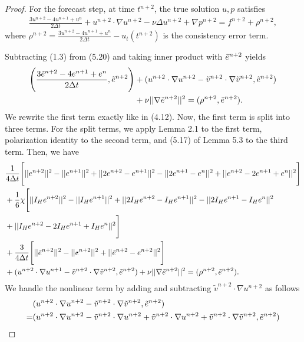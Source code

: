 \documentclass[10pt,a4paper]{amsart}
\begin{document}
\begin{proof}
    For the forecast step, at time $t^{n+2}$, the true solution $u,p$ satisfies
    \begin{align}
        \frac{3u^{n+2}-4u^{n+1}+u^n}{2\Delta t}+u^{n+2} \cdot \nabla u^{n+2} - \nu \Delta u^{n+2} + \nabla p^{n+2}=f^{n+2}+\rho^{n+2},
    \end{align}
    where $\rho^{n+2}=\frac{3u^{n+2}-4u^{n+1}+u^n}{2\Delta t}-u_t(t^{n+2})$ is the consistency error term.
    
    Subtracting (1.3) from (5.20) and taking inner product with $\Tilde{e}^{n+2}$ yields
    \begin{align}
        \Bigg(\frac{3\Tilde{e}^{n+2}-4e^{n+1}+e^n}{2\Delta t}, \Tilde{e}^{n+2}\Bigg)
        &+(u^{n+2} \cdot \nabla u^{n+2}- \tilde{v}^{n+2} \cdot \nabla \Tilde{v}^{n+2}, \Tilde{e}^{n+2}) \notag \\
        &+ \nu ||\nabla \Tilde{e}^{n+2}||^2=(\rho^{n+2}, \Tilde{e}^{n+2}).
    \end{align}
    We rewrite the first term exactly like in (4.12). Now, the first term is split into three terms. For the split terms, we apply Lemma 2.1 to the first term, polarization identity to the second term, and (5.17) of Lemma 5.3 to the third term. Then, we have
    \begin{align}
        &\frac{1}{4\Delta t}\Bigg[||e^{n+2}||^2-||e^{n+1}||^2+||2e^{n+2}-e^{n+1}||^2-||2e^{n+1}-e^n||^2+||e^{n+2}-2e^{n+1}+e^n||^2\Bigg] \notag   \\
        &+\frac{1}{6}\chi \Bigg[ ||I_He^{n+2}||^2 - ||I_He^{n+1}||^2 + ||2I_He^{n+2}-I_He^{n+1}||^2 - ||2I_He^{n+1}-I_He^n||^2  \notag \\
        &+||I_He^{n+2}-2I_He^{n+1}+I_He^n||^2\Bigg] \\
        &+\frac{3}{4\Delta t}\Bigg[||\Tilde{e}^{n+2}||^2-||e^{n+2}||^2 + ||\Tilde{e}^{n+2}-e^{n+2}||^2 \Bigg] \notag \\
        &+(u^{n+2} \cdot \nabla u^{n+1}- \tilde{v}^{n+2} \cdot \nabla \Tilde{v}^{n+2}, \Tilde{e}^{n+2}) +\nu ||\nabla \Tilde{e}^{n+2}||^2 = (\rho^{n+2},\Tilde{e}^{n+2}). \notag
    \end{align}
    We handle the nonlinear term by adding and subtracting $\tilde{v}^{n+2}\cdot \nabla u^{n+2}$ as follows
    \begin{align}
        &(u^{n+2} \cdot \nabla u^{n+2}-\tilde{v}^{n+2} \cdot \nabla \Tilde{v}^{n+2}, \Tilde{e}^{n+2}) \notag \\
        =&(u^{n+2} \cdot \nabla u^{n+2} -\tilde{v}^{n+2} \cdot \nabla u^{n+2} + \tilde{v}^{n+2}\cdot \nabla u^{n+2} + \tilde{v}^{n+2}\cdot \nabla \tilde{v}^{n+2}, \Tilde{e}^{n+2}) \notag \\

\end{align}
\end{proof}
\end{document}
